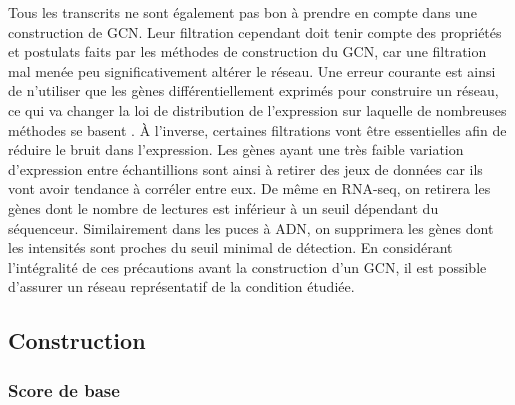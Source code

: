 Tous les transcrits ne sont également pas bon à prendre en compte dans une construction de \acrshort{GCN}. Leur filtration cependant doit tenir compte des propriétés et postulats faits par les méthodes de construction du \acrshort{GCN}, car une filtration mal menée peu significativement altérer le réseau. Une erreur courante est ainsi de n'utiliser que les gènes différentiellement exprimés pour construire un réseau, ce qui va changer la loi de distribution de l'expression sur laquelle de nombreuses méthodes se basent \cite{Zhang2005a}. À l'inverse, certaines filtrations vont être essentielles afin de réduire le bruit dans l'expression. Les gènes ayant une très faible variation d'expression entre échantillions sont ainsi à retirer des jeux de données car ils vont avoir tendance à corréler entre eux. De même en RNA-seq, on retirera les gènes dont le nombre de lectures est inférieur à un seuil dépendant du séquenceur. Similairement dans les puces à ADN, on supprimera les gènes dont les intensités sont proches du seuil minimal de détection. En considérant l'intégralité de ces précautions avant la construction d'un \acrshort{GCN}, il est possible d'assurer un réseau représentatif de la condition étudiée.



\subsection{Construction}

\subsubsection{Score de base}

